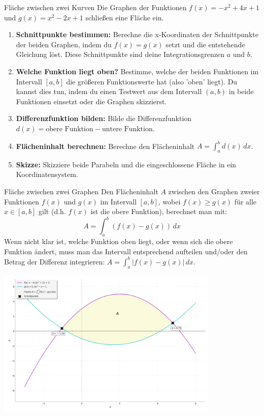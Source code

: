 \begin{aufgabenumgebung}{Fläche zwischen zwei Kurven}
Die Graphen der Funktionen $f(x) = -x^2 + 4x + 1$ und $g(x) = x^2 - 2x + 1$ schließen eine Fläche ein.
\begin{enumerate}
    \item \textbf{Schnittpunkte bestimmen:} Berechne die x-Koordinaten der Schnittpunkte der beiden Graphen, indem du $f(x) = g(x)$ setzt und die entstehende Gleichung löst. Diese Schnittpunkte sind deine Integrationsgrenzen $a$ und $b$.
    \item \textbf{Welche Funktion liegt oben?} Bestimme, welche der beiden Funktionen im Intervall $[a,b]$ die größeren Funktionswerte hat (also 'oben' liegt). Du kannst dies tun, indem du einen Testwert aus dem Intervall $(a,b)$ in beide Funktionen einsetzt oder die Graphen skizzierst.
    \item \textbf{Differenzfunktion bilden:} Bilde die Differenzfunktion $d(x) = \text{obere Funktion} - \text{untere Funktion}$.
    \item \textbf{Flächeninhalt berechnen:} Berechne den Flächeninhalt $A = \int_a^b d(x) \,dx$.
    \item \textbf{Skizze:} Skizziere beide Parabeln und die eingeschlossene Fläche in ein Koordinatensystem.
\end{enumerate}
\begin{merksatzumgebung}{Fläche zwischen zwei Graphen}
Den Flächeninhalt $A$ zwischen den Graphen zweier Funktionen $f(x)$ und $g(x)$ im Intervall $[a,b]$, wobei $f(x) \ge g(x)$ für alle $x \in [a,b]$ gilt (d.h. $f(x)$ ist die obere Funktion), berechnet man mit:
\[ A = \int_a^b (f(x) - g(x)) \,dx \]
Wenn nicht klar ist, welche Funktion oben liegt, oder wenn sich die obere Funktion ändert, muss man das Intervall entsprechend aufteilen und/oder den Betrag der Differenz integrieren: $A = \int_a^b |f(x) - g(x)| \,dx$.
\end{merksatzumgebung}
\begin{center}
    \includegraphics[width=0.8\textwidth]{grafiken/Integral_Flaeche_zwischen_Kurven.png}
    \label{fig:flaeche_zwischen_kurven}
\end{center}
\end{aufgabenumgebung}

